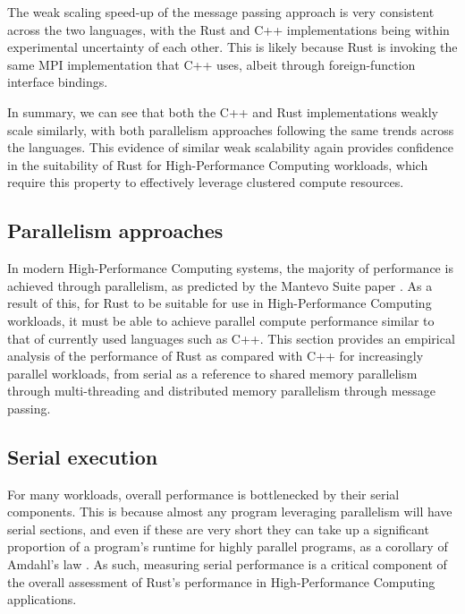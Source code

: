 The weak scaling speed-up of the message passing approach is very consistent across the two languages, with the Rust and C++ implementations being within experimental uncertainty of each other. This is likely because Rust is invoking the same MPI implementation that C++ uses, albeit through foreign-function interface bindings.

In summary, we can see that both the C++ and Rust implementations weakly scale similarly, with both parallelism approaches following the same trends across the languages. This evidence of similar weak scalability again provides confidence in the suitability of Rust for High-Performance Computing workloads, which require this property to effectively leverage clustered compute resources.




\subsection{Parallelism approaches}
\label{ssec:parallelism-approaches}

In modern High-Performance Computing systems, the majority of performance is achieved through parallelism, as predicted by the Mantevo Suite paper \cite{heroux2013mantevo}. As a result of this, for Rust to be suitable for use in High-Performance Computing workloads, it must be able to achieve parallel compute performance similar to that of currently used languages such as C++. This section provides an empirical analysis of the performance of Rust as compared with C++ for increasingly parallel workloads, from serial as a reference to shared memory parallelism through multi-threading and distributed memory parallelism through message passing.

\subsection{Serial execution}
\label{ssec:multi-threaded}

For many workloads, overall performance is bottlenecked by their serial components. This is because almost any program leveraging parallelism will have serial sections, and even if these are very short they can take up a significant proportion of a program's runtime for highly parallel programs, as a corollary of Amdahl's law \cite{amdahlsLaw}. As such, measuring serial performance is a critical component of the overall assessment of Rust's performance in High-Performance Computing applications.

